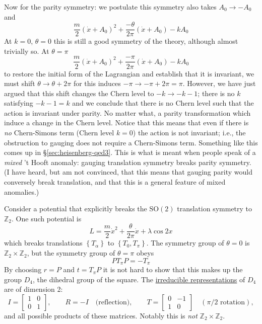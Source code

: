 \documentclass{report}
\begin{document}
Now for the parity symmetry: we postulate this symmetry also takes $ A_0
\rightarrow -A_0$ and
\begin{equation*}
	\frac{m}{2}(\dot{x} + A_0)^2 
		+ \frac{-\theta}{2\pi}(\dot{x} + A_0) - k A_0
\end{equation*}
At $ k=0 $, $ \theta=0 $ this is still a good symmetry of the theory, although 
almost trivially so. At $ \theta=\pi $
\begin{equation*}
	\frac{m}{2}(\dot{x} + A_0)^2 
		+ \frac{-\pi}{2\pi}(\dot{x} + A_0) - k A_0
\end{equation*}
to restore the initial form of the Lagrangian and establish that it is invariant,
we must shift $ \theta \rightarrow \theta +2\pi $ for this induces $ -\pi
\rightarrow -\pi + 2\pi = \pi $. However, we have just argued that this shift 
changes the Chern level to $ -k \rightarrow -k-1 $; there is no $ k $ satisfying 
$ -k -1 = k $ and we conclude that there is no Chern level such that the 
action is invariant under parity. No matter what, a parity transformation 
which induce a change in the Chern level. Notice that this means that even 
if there is \textit{no} Chern-Simons term (Chern level $ k=0 $) the action 
is not invariant; i.e., the obstruction to gauging does not require a Chern-Simons 
term. Something like this comes up in \S \cref{sec:heisenberg-qed3}. This is
what is meant when people speak of a \textit{mixed} 't Hooft anomaly: gauging
translation symmetry breaks parity symmetry. (I have heard, but am not
convinced, that this means that gauging parity would conversely break
translation, and that this is a general feature of mixed anomalies.) 

 Consider a potential that explicitly breaks 
the $ \text{SO}(2) $ translation symmetry to $ \mathbb{Z}_2 $. One such 
potential is 
\begin{equation*}
	L = \frac{m}{2}\dot{x}^2 + \frac{\theta}{2\pi}\dot{x} 
		+ \lambda \cos 2x
\end{equation*}
which breaks translations $ \left\{T_\alpha\right\} $ to $ \left\{T_0,
T_\pi\right\} $. The symmetry group of $ \theta=0 $ is $ \mathbb{Z}_2 \times 
\mathbb{Z}_2 $, but the symmetry group of $ \theta=\pi $ obeys 
\begin{equation*}
	PT_\pi P = -T_\pi
\end{equation*}
By choosing $ r = P $ and $ t = T_\pi P $ it is not hard to show that this 
makes up the group $ D_4 $, the dihedral group of the square. The
\href{https://proofwiki.org/wiki/Dihedral_Group_D4/Matrix_Representation}{irreducible
representations} of $ D_4 $ are of dimension 2:
\begin{equation*}
	I = \begin{bmatrix}
		1 & 0 \\ 0 & 1 
	\end{bmatrix},\qquad 
	R = - I \quad \text{(reflection)},\qquad
	T = \begin{bmatrix}
		0 & -1 \\ 1 & 0
	\end{bmatrix}\quad  (\pi/2 \text{ rotation}),
\end{equation*}
and all possible products of these matrices. Notably this is \textit{not} 
$ \mathbb{Z}_2\times \mathbb{Z}_2 $.
\end{document}
